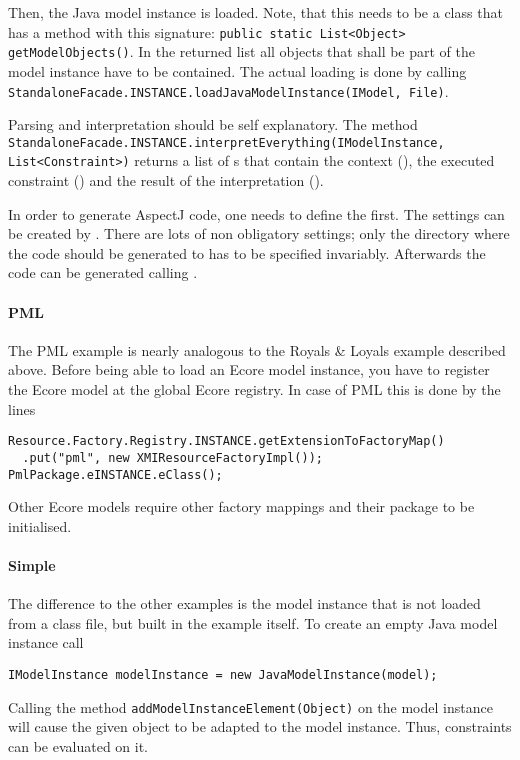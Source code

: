 Then, the Java model instance is loaded. Note, that this needs to be a class that has a method with this signature: \lstinline[breaklines=true]{public static List<Object> getModelObjects()}. In the returned list all objects that shall be part of the model instance have to be contained. The actual loading is done by calling \lstinline[breaklines=true]{StandaloneFacade.INSTANCE.loadJavaModelInstance(IModel, File)}.

Parsing and interpretation should be self explanatory. The method \lstinline[breaklines=true]{StandaloneFacade.INSTANCE.interpretEverything(IModelInstance, List<Constraint>)} returns a list of s that contain the context (), the executed constraint () and the result of the interpretation ().

In order to generate AspectJ code, one needs to define the  first. The settings can be created by . There are lots of non obligatory settings; only the directory where the code should be generated to has to be specified invariably. Afterwards the code can be generated calling .

\paragraph{PML}
The PML example is nearly analogous to the Royals \& Loyals example described above. Before being able to load an Ecore model instance, you have to register the Ecore model at the global Ecore registry. In case of PML this is done by the lines 
\lstset{language=Java}
\begin{lstlisting}
Resource.Factory.Registry.INSTANCE.getExtensionToFactoryMap()
  .put("pml", new XMIResourceFactoryImpl());
PmlPackage.eINSTANCE.eClass();
\end{lstlisting}
Other Ecore models require other factory mappings and their package to be initialised.

\paragraph{Simple}
The difference to the other examples is the model instance that is not loaded from a class file, but built in the example itself. To create an empty Java model instance call 
\lstset{language=Java}
\begin{lstlisting}
IModelInstance modelInstance = new JavaModelInstance(model);
\end{lstlisting}
Calling the method \lstinline[breaklines=true]{addModelInstanceElement(Object)} on the model instance will cause the given object to be adapted to the model instance. Thus, constraints can be evaluated on it.


